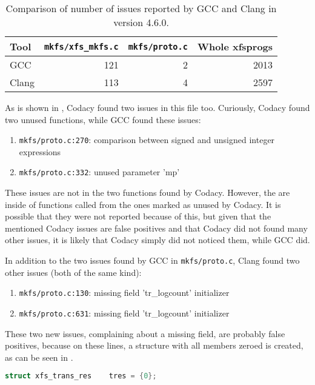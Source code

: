 \begin{table}[h]
\begin{tabular}{|l||r|r||r|}
\hline
Tool & {\tt mkfs/xfs\_mkfs.c} & {\tt mkfs/proto.c} & Whole xfsprogs \\
\hline
GCC & 121 & 2 & 2013 \\
\hline
Clang & 113 & 4 & 2597 \\
\hline
\end{tabular}
\caption{Comparison of number of issues reported by GCC and Clang in version
4.6.0.}
\label{tab:results:gcc:4.6}
\end{table}

As is shown in , Codacy found two issues in
this file too. Curiously, Codacy found two unused functions, while GCC
found these issues:
\begin{enumerate}
	\item {\tt mkfs/proto.c:270}: comparison between signed and unsigned integer expressions
	\item {\tt mkfs/proto.c:332}: unused parameter 'mp'
\end{enumerate}

These issues are not in the two functions found by Codacy. However, the are
inside of functions called from the ones marked as unused by Codacy. It is
possible that they were not reported because of this, but given that the
mentioned Codacy issues are false positives and that Codacy did not found many
other issues, it is likely that Codacy simply did not noticed them, while GCC
did.

In addition to the two issues found by GCC in {\tt mkfs/proto.c}, Clang
found two other issues (both of the same kind):
\begin{enumerate}
	\item {\tt mkfs/proto.c:130}: missing field 'tr\_logcount' initializer
	\item {\tt mkfs/proto.c:631}: missing field 'tr\_logcount' initializer
\end{enumerate}

These two new issues, complaining about a missing field, are probably false
positives, because on these lines, a structure with all members zeroed is
created, as can be seen in .

\begin{lstlisting}[frame=none, basicstyle=\footnotesize\ttfamily,
language=C, numbers=none, numberstyle=\tiny\color{black},caption=
{One of the two lines on which Clang reports a missing field in structure
initialization.},
label={lst:results:zeroedStruct}]
struct xfs_trans_res    tres = {0};
\end{lstlisting}

